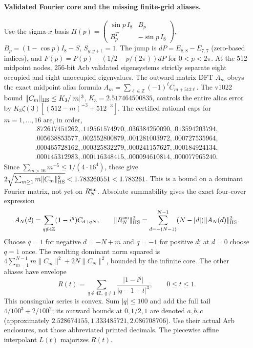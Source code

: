 \paragraph{Validated Fourier core and the missing finite-grid aliases.}
Use the sigma-$x$ basis
$H(p)=\left(\begin{smallmatrix}\sin p\,I_8&B_p\\B_p^T&-\sin p\,I_8\end{smallmatrix}\right)$,
$B_p=(1-\cos p)I_8-S$, $S_{y,y+1}=1$. The jump is
$dP=E_{8,8}-E_{7,7}$ (zero-based indices), and
$F(p)=P(p)-(1/2-p/(2\pi))dP$ for $0<p<2\pi$.
At the 512 midpoint nodes, 256-bit Acb validated eigensystems strictly
separate eight occupied and eight unoccupied eigenvalues. The outward
matrix DFT $A_m$ obeys the exact midpoint alias formula
$A_m=\sum_{\ell\in\mathbb Z}(-1)^\ell C_{m+512\ell}$.
The v1022 bound $\|C_m\|_{\rm HS}\le K_3/|m|^3$,
$K_3=2.517464500835$, controls the entire alias error by
$K_3\zeta(3)[(512-m)^{-3}+512^{-3}]$. The certified rational caps
for $m=1,\ldots,16$ are, in order,
\begin{gather*}
 .872617451262, .119561574970, .036384250090, .013594203794,\\
 .005638853577, .002552800879, .001281003972, .000727535964,\\
 .000465728162, .000325832279, .000241157627, .000184924134,\\
 .000145312983, .000116348415, .000094610814, .000077965240.
\end{gather*}
Since $\sum_{m>16}m^{-5}\le1/(4\cdot16^4)$, these give
$2\sqrt{\sum_{m\ge1}m\|C_m\|_{\rm HS}^2}<1.783260551<1.783261$.
This is a bound on a dominant Fourier matrix, not yet on $R_N^{\rm sm}$.
Absolute summability gives the exact four-cover expression
\[
 A_N(d)=\sum_{q\notin4\mathbb Z}(1-i^q)C_{d+qN},\qquad
 \|R_N^{\rm sm}\|_{\rm HS}^2
 =\sum_{d=-(N-1)}^{N-1}(N-|d|)\|A_N(d)\|_{\rm HS}^2.
\]
Choose $q=1$ for negative $d=-N+m$ and $q=-1$ for positive $d$;
at $d=0$ choose $q=1$ once. The resulting dominant norm squared is
$4\sum_{m=1}^{N-1}m\|C_m\|^2+2N\|C_N\|^2$, bounded by the infinite core.
The other aliases have envelope
\[
 R(t)=\sum_{q\notin4\mathbb Z,\ q\ne1}
           \frac{|1-i^q|}{|q-1+t|^3},\qquad 0\le t\le1.
\]
This nonsingular series is convex. Sum $|q|\le100$ and add the full
tail $4/100^3+2/100^2$; its outward bounds at $0,1/2,1$ are denoted
$a,b,c$ (approximately $2.528674155,1.333485721,2.086708706$).
Use their actual Arb enclosures, not those abbreviated printed decimals.
The piecewise affine interpolant $L(t)$ majorizes $R(t)$.
